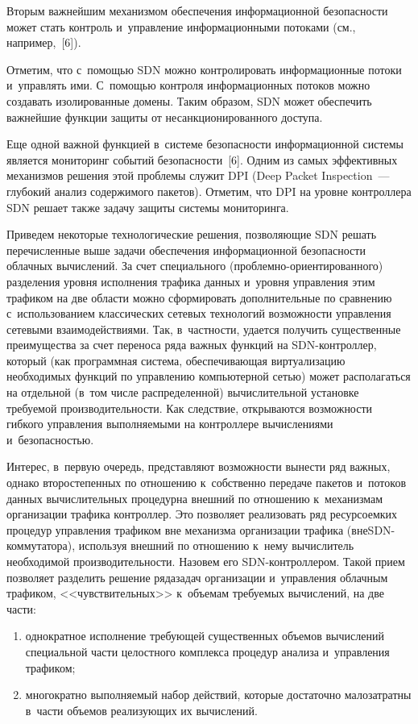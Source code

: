 \begin{multicols}{2}
  Вторым важнейшим механизмом обеспечения информационной 
безопасности может стать контроль и~управление информационными потоками 
(см., например,~[6]).
  
  Отметим, что с~помощью SDN можно контролировать информационные 
потоки и~управлять ими. С~помощью контроля информационных потоков 
можно создавать изолированные домены. Таким образом, SDN может 
обеспечить важнейшие функции защиты от несанкционированного доступа.
  
  Еще одной важной функцией в~системе безопасности информационной 
системы является мониторинг событий безопасности~[6]. Одним из самых 
эффективных механизмов решения этой проблемы служит DPI (Deep Packet 
Inspection~--- глубокий анализ содержимого пакетов). Отметим, что DPI на 
уровне контроллера SDN решает также задачу защиты системы мониторинга.
  
  Приведем некоторые технологические решения, позволяющие SDN решать 
перечисленные выше задачи обеспечения информационной без\-опас\-ности 
облачных вычислений. За счет специ\-ального  
(проб\-лем\-но-ори\-ен\-ти\-ро\-ван\-но\-го) разделения уровня исполнения 
трафика данных и~уровня управления этим трафиком на две области можно 
сформировать дополнительные по сравнению с~использованием классических 
сетевых технологий возможности управления сетевыми взаимодействиями. Так, 
в~част\-ности, удается получить существенные преимущества за счет переноса 
ряда важных функций на SDN-конт\-рол\-лер, который (как программная 
система, обеспечивающая виртуализацию необхо\-димых функций по 
управлению компьютерной \mbox{сетью}) может располагаться на отдельной (в~том 
числе распределенной) вычислительной установке требуемой 
производительности. Как следствие, открываются возможности гибкого 
управления выполняемыми на контроллере вы\-чис\-ле\-ни\-ями и~без\-опас\-ностью.
  
  Интерес, в~первую очередь, представляют возможности вынести ряд важных, 
однако второстепенных по отношению к~собственно передаче пакетов 
и~потоков данных вычислительных процедур\linebreak на внешний по отношению 
к~механизмам организации трафика контроллер. Это позволяет реализовать ряд 
ресурсоемких процедур управления трафиком вне механизма организации 
трафика (вне\linebreak SDN-ком\-му\-та\-то\-ра), используя внешний по отношению 
к~нему вычислитель необходимой про\-из\-во\-ди\-тель\-ности. Назовем его  
SDN-конт\-рол\-ле\-ром. Такой прием позволяет разделить решение ряда\linebreak задач 
организации и~управ\-ле\-ния облачным трафиком, <<чувствительных>> 
к~объемам требуемых вы\-чис\-ле\-ний, на две части:
  \begin{enumerate}[(1)]
\item однократное исполнение требующей существенных объемов 
вычислений специальной части целостного комплекса процедур анализа 
и~управления трафиком;
\item многократно выполняемый набор действий, которые достаточно 
малозатратны в~части объемов реализующих их вычислений.
\end{enumerate}


\end{multicols}
